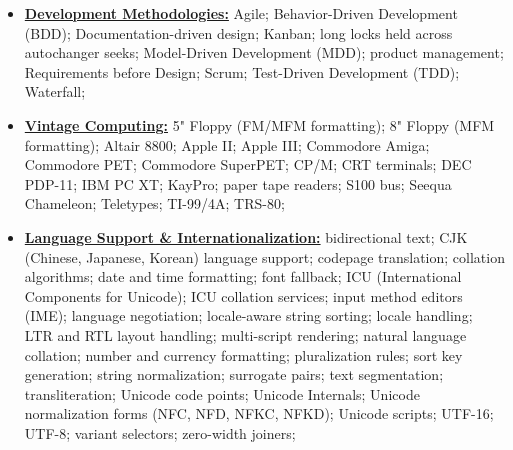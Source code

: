 \documentclass[letterpaper,11pt]{article}
\begin{document}
{\begin{itemize}[leftmargin=0.1in, label={}, itemsep=0pt, parsep=0pt, topsep=0pt, partopsep=0pt]
\item
\textbf{\underline{Development Methodologies:}} \hspace{0pt}
Agile;
Behavior-Driven Development (BDD);
Documentation-driven design;
Kanban;
long locks held across autochanger seeks;
Model-Driven Development (MDD);
product management;
Requirements before Design;
Scrum;
Test-Driven Development (TDD);
Waterfall;

\item
\textbf{\underline{Vintage Computing:}} \hspace{0pt}
5" Floppy (FM/MFM formatting);
8" Floppy (MFM formatting);
Altair 8800;
Apple II;
Apple III;
Commodore Amiga;
Commodore PET;
Commodore SuperPET;
CP/M;
CRT terminals;
DEC PDP-11;
IBM PC XT;
KayPro;
paper tape readers;
S100 bus;
Seequa Chameleon;
Teletypes;
TI-99/4A;
TRS-80;

\item
\textbf{\underline{Language Support \& Internationalization:}} \hspace{0pt}
bidirectional text;
CJK (Chinese, Japanese, Korean) language support;
codepage translation;
collation algorithms;
date and time formatting;
font fallback;
ICU (International Components for Unicode);
ICU collation services;
input method editors (IME);
language negotiation;
locale-aware string sorting;
locale handling;
LTR and RTL layout handling;
multi-script rendering;
natural language collation;
number and currency formatting;
pluralization rules;
sort key generation;
string normalization;
surrogate pairs;
text segmentation;
transliteration;
Unicode code points;
Unicode Internals;
Unicode normalization forms (NFC, NFD, NFKC, NFKD);
Unicode scripts;
UTF-16;
UTF-8;
variant selectors;
zero-width joiners;


\end{itemize}}
\end{document}
